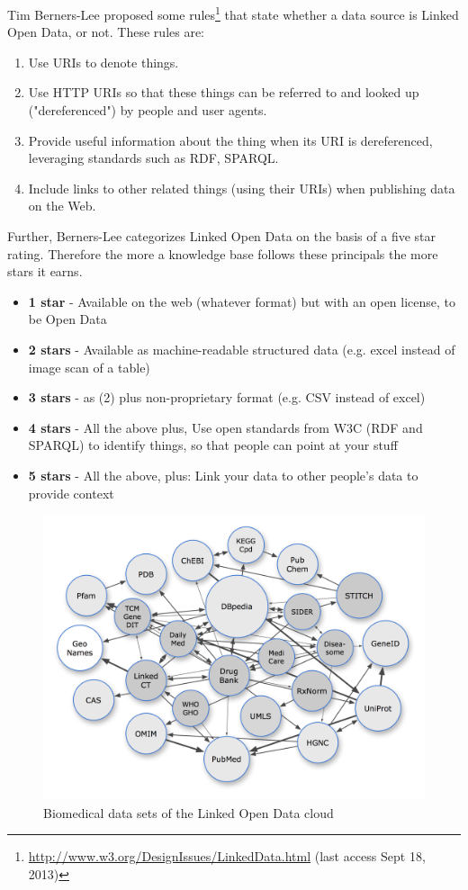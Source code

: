 Tim Berners-Lee proposed some rules\footnote{\url{http://www.w3.org/DesignIssues/LinkedData.html} (last access Sept 18, 2013)} that state whether a data source is Linked Open Data, or not.
These rules are:
\begin{enumerate}
\item Use URIs to denote things.
\item Use HTTP URIs so that these things can be referred to and looked up ("dereferenced") by people and user agents.
\item Provide useful information about the thing when its URI is dereferenced, leveraging standards such as RDF, SPARQL.
\item Include links to other related things (using their URIs) when publishing data on the Web.
\end{enumerate}

Further, Berners-Lee categorizes Linked Open Data on the basis of a five star rating.
Therefore the more a knowledge base follows these principals the more stars it earns.
\begin{itemize}
\item \textbf{1 star} - Available on the web (whatever format) but with an open license, to be Open Data
\item \textbf{2 stars} - Available as machine-readable structured data (e.g. excel instead of image scan of a table)
\item \textbf{3 stars} - as (2) plus non-proprietary format (e.g. CSV instead of excel)
\item \textbf{4 stars} - All the above plus, Use open standards from W3C (RDF and SPARQL) to identify things, so that people can point at your stuff
\item \textbf{5 stars} - All the above, plus: Link your data to other people’s data to provide context
\end{itemize}

\begin{figure}
  \centering
  \includegraphics[scale=0.7]{preliminaries/2010-12-04_lodd_cloud.png}%
  \caption{Biomedical data sets of the Linked Open Data cloud}%
  \label{fig:lod_cloud}
\end{figure}


